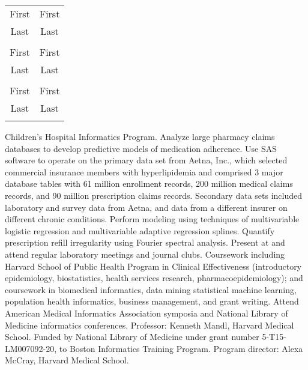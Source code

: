 \documentclass[12pt]{article}
\begin{document}
\begin{tabular}{|c|c|} %

\hline
\rule{0pt}{1.5in}First & First \\
Last & Last \\
\rule{0pt}{1.5in} & \\
\hline

\rule{0pt}{1.5in}First & First \\
Last & Last \\
\rule{0pt}{1.5in} & \\
\hline

\rule{0pt}{1.5in}First & First \\
Last & Last \\
\rule{0pt}{1.5in} & \\
\hline

\end{tabular}

Children’s Hospital Informatics Program. Analyze large pharmacy claims
databases to develop predictive models of medication adherence. Use
SAS software to operate on the primary data set from Aetna, Inc.,
which selected commercial insurance members with hyperlipidemia and
comprised 3 major database tables with 61 million enrollment records,
200 million medical claims records, and 90 million prescription claims
records. Secondary data sets included laboratory and survey data from
Aetna, and data from a different insurer on different chronic
conditions. Perform modeling using techniques of multivariable
logistic regression and multivariable adaptive regression splines.
Quantify prescription refill irregularity using Fourier spectral
analysis. Present at and attend regular laboratory meetings and
journal clubs. Coursework including Harvard School of Public Health
Program in Clinical Effectiveness (introductory epidemiology,
biostatistics, health services research, pharmacoepidemiology); and
coursework in biomedical informatics, data mining statistical machine
learning, population health informatics, business management, and
grant writing. Attend American Medical Informatics Association
symposia and National Library of Medicine informatics conferences.
Professor: Kenneth Mandl, Harvard Medical School. Funded by National
Library of Medicine under grant number 5-T15-LM007092-20, to Boston
Informatics Training Program. Program director: Alexa McCray, Harvard
Medical School.
\end{document}
